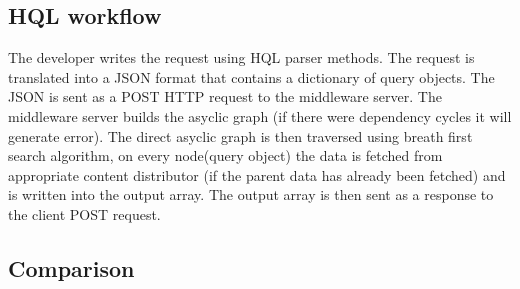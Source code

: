 
\subsection{HQL workflow}

The developer writes the request using HQL parser methods. The request is translated into a JSON format that contains a dictionary of query objects. The JSON is sent as a POST HTTP request to the middleware server. The middleware server builds the asyclic graph (if there were dependency cycles it will generate error). The direct asyclic graph is then traversed using breath first search algorithm, on every node(query object) the data is fetched from appropriate content distributor (if the parent data has already been fetched) and is written into the output array. The output array is then sent as a response to the client POST request. 


\subsection{Comparison}



\newpage